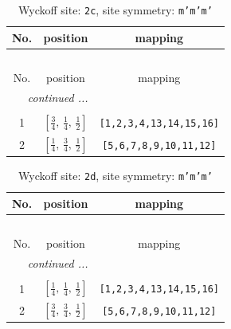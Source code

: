 \documentclass[fleqn,8pt]{jsarticle}
\begin{document}
\renewcommand{\arraystretch}{1.2}
\begin{longtable}{ccc}
\caption{Wyckoff site: {\tt 2c}, site symmetry: {\tt m'm'm'}}
 \\
 \hline \hline
No. & position & mapping \\ \hline \endfirsthead

\multicolumn{2}{l}{\tablename\ \thetable{}} \\
 \hline \hline
No. & position & mapping \\ \hline \endhead

 \hline \hline
\multicolumn{2}{r}{\footnotesize\it continued ...} \\ \endfoot

 \hline \hline
\multicolumn{2}{r}{} \\ \endlastfoot

1 & $\left[ \frac{3}{4},\, \frac{1}{4},\, \frac{1}{2} \right]$ & {\tt [1,2,3,4,13,14,15,16]} \\ \hline
2 & $\left[ \frac{1}{4},\, \frac{3}{4},\, \frac{1}{2} \right]$ & {\tt [5,6,7,8,9,10,11,12]} \\
\end{longtable}
\renewcommand{\arraystretch}{1.2}
\begin{longtable}{ccc}
\caption{Wyckoff site: {\tt 2d}, site symmetry: {\tt m'm'm'}}
 \\
 \hline \hline
No. & position & mapping \\ \hline \endfirsthead

\multicolumn{2}{l}{\tablename\ \thetable{}} \\
 \hline \hline
No. & position & mapping \\ \hline \endhead

 \hline \hline
\multicolumn{2}{r}{\footnotesize\it continued ...} \\ \endfoot

 \hline \hline
\multicolumn{2}{r}{} \\ \endlastfoot

1 & $\left[ \frac{1}{4},\, \frac{1}{4},\, \frac{1}{2} \right]$ & {\tt [1,2,3,4,13,14,15,16]} \\ \hline
2 & $\left[ \frac{3}{4},\, \frac{3}{4},\, \frac{1}{2} \right]$ & {\tt [5,6,7,8,9,10,11,12]} \\
\end{longtable}
\renewcommand{\arraystretch}{1.2}
\end{document}
